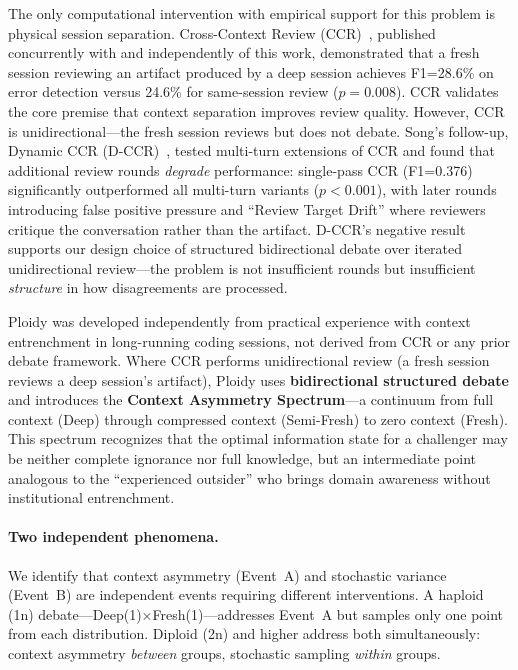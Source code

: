\documentclass[11pt]{article}
\begin{document}
The only computational intervention with empirical support for this problem is physical session separation. Cross-Context Review (CCR)~\citep{song2026ccr}, published concurrently with and independently of this work, demonstrated that a fresh session reviewing an artifact produced by a deep session achieves F1=28.6\% on error detection versus 24.6\% for same-session review ($p=0.008$). CCR validates the core premise that context separation improves review quality. However, CCR is unidirectional---the fresh session reviews but does not debate. Song's follow-up, Dynamic CCR (D-CCR)~\citep{song2026dccr}, tested multi-turn extensions of CCR and found that additional review rounds \emph{degrade} performance: single-pass CCR (F1=0.376) significantly outperformed all multi-turn variants ($p<0.001$), with later rounds introducing false positive pressure and ``Review Target Drift'' where reviewers critique the conversation rather than the artifact. D-CCR's negative result supports our design choice of structured bidirectional debate over iterated unidirectional review---the problem is not insufficient rounds but insufficient \emph{structure} in how disagreements are processed.

Ploidy was developed independently from practical experience with context entrenchment in long-running coding sessions, not derived from CCR or any prior debate framework. Where CCR performs unidirectional review (a fresh session reviews a deep session's artifact), Ploidy uses \textbf{bidirectional structured debate} and introduces the \textbf{Context Asymmetry Spectrum}---a continuum from full context (Deep) through compressed context (Semi-Fresh) to zero context (Fresh). This spectrum recognizes that the optimal information state for a challenger may be neither complete ignorance nor full knowledge, but an intermediate point analogous to the ``experienced outsider'' who brings domain awareness without institutional entrenchment.

\paragraph{Two independent phenomena.} We identify that context asymmetry (Event~A) and stochastic variance (Event~B) are independent events requiring different interventions. A haploid (1n) debate---Deep(1)$\times$Fresh(1)---addresses Event~A but samples only one point from each distribution. Diploid (2n) and higher address both simultaneously: context asymmetry \emph{between} groups, stochastic sampling \emph{within} groups.
\end{document}
